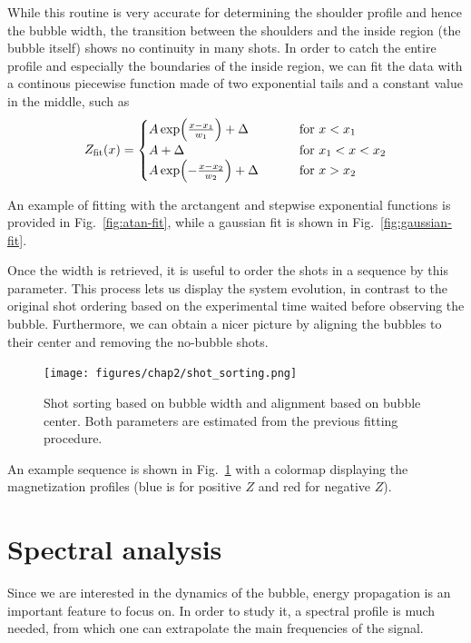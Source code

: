 While this routine is very accurate for determining the shoulder profile and hence the bubble width, the transition between the shoulders and the inside region (the bubble itself) shows no continuity in many shots. In order to catch the entire profile and especially the boundaries of the inside region, we can fit the data with a continous piecewise function made of two exponential tails and a constant value in the middle, such as
\begin{equation*}
    Z_{\rm fit}(x) = 
    \begin{cases}
        A \exp(\frac{x-x_1}{w_1}) + \Delta \qquad\quad &\text{for } x < x_1\\
        A + \Delta \qquad\qquad\qquad\qquad &\text{for } x_1 < x < x_2\\
        A \exp(-\frac{x-x_2}{w_2}) + \Delta \qquad &\text{for } x > x_2
    \end{cases}
\end{equation*}

An example of fitting with the arctangent and stepwise exponential functions is provided in Fig.\ \ref{fig:atan-fit}, while a gaussian fit is shown in Fig.\ \ref{fig:gaussian-fit}.

Once the width is retrieved, it is useful to order the shots in a sequence by this parameter. This process lets us display the system evolution, in contrast to the original shot ordering based on the experimental time waited before observing the bubble. Furthermore, we can obtain a nicer picture by aligning the bubbles to their center and removing the no-bubble shots.
\begin{figure}[h!]
    \centering
    \texttt{[image: figures/chap2/shot\_sorting.png]}
    \caption{Shot sorting based on bubble width and alignment based on bubble center. Both parameters are estimated from the previous fitting procedure.}
    \label{fig:sorting}
\end{figure}
An example sequence is shown in Fig.\ \ref{fig:sorting} with a colormap displaying the magnetization profiles (blue is for positive $Z$ and red for negative $Z$).

\section{Spectral analysis}
Since we are interested in the dynamics of the bubble, energy propagation is an important feature to focus on. In order to study it, a spectral profile is much needed, from which one can extrapolate the main frequencies of the signal. 

